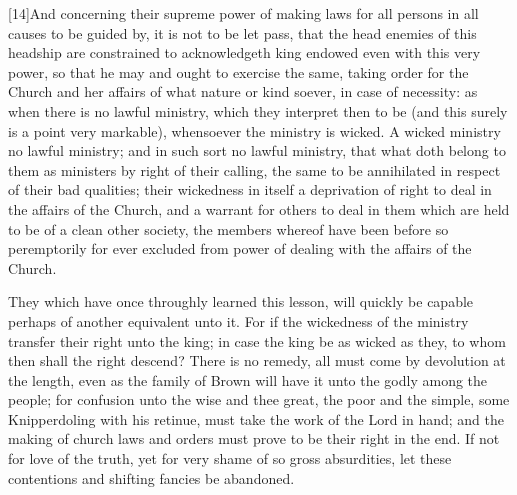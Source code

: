 [14]And concerning their supreme power of making laws for all persons in all causes to be guided by, it is not to be let pass, that the head enemies of this headship are constrained to acknowledgeth king endowed even with this very power, so that he may and ought to exercise the same, taking order for the Church and her affairs of what nature or kind soever, in case of necessity: as when there is no lawful ministry, which they interpret then to be (and this surely is a point very markable), whensoever the ministry is wicked. A wicked ministry no lawful ministry; and in such sort no lawful ministry, that what doth belong to them as ministers by right of their calling, the same to be annihilated in respect of their bad qualities; their wickedness in itself a deprivation of right to deal in the affairs of the Church, and a warrant for others to deal in them which are held to be of a clean other society, the members whereof have been before so peremptorily for ever excluded from power of dealing with the affairs of the Church.


They which have once throughly learned this lesson, will quickly be capable perhaps of another equivalent unto it. For if the wickedness of the ministry transfer their right unto the king; in case the king be as wicked as they, to whom then shall the right descend? There is no remedy, all must come by devolution at the length, even as the family of Brown will have it unto the godly among the people; for confusion unto the wise and thee great, the poor and the simple, some Knipperdoling with his retinue, must take the work of the Lord in hand; and the making of church laws and orders  must prove to be their right in the end. If not for love of the truth, yet for very shame of so gross absurdities, let these contentions and shifting  fancies be abandoned.

